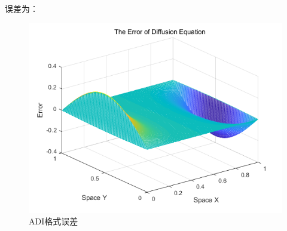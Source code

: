 \documentclass[fontset=mac]{ctexart}
\begin{document}
	误差为：
	\begin{figure}[H]
		\centering
		\includegraphics[width=0.7\linewidth]{fig/err}
		\caption{ADI格式误差}
	\end{figure}
	
\end{document}
